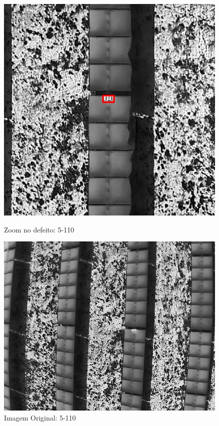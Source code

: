 \documentclass[dvipsnames]{article}%
\begin{document}
\begin{figure}[h!]
\begin{minipage}{0.31\linewidth}
\centering%
\centering%
\includegraphics[width=\linewidth]{report_images/hotspots_5-110_cropped.jpg}%
\caption{Zoom no defeito: 5-110}%
\end{minipage}%
\hfill%
\begin{minipage}{0.31\linewidth}%
\centering%
\centering%
\includegraphics[width=\linewidth]{report_images/hotspots_5-110.jpg}%
\caption{Imagem Original: 5-110}%
\end{minipage}%
\end{figure}
\end{document}
